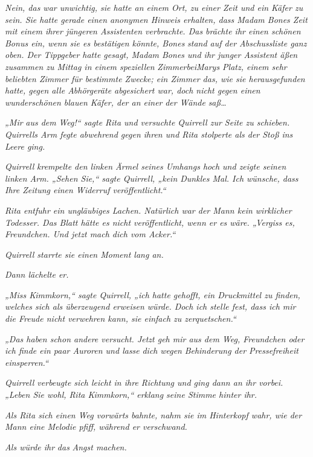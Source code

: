 {\emph{Nein, das war unwichtig, sie hatte an einem Ort, zu einer Zeit und ein Käfer zu sein. Sie hatte gerade einen anonymen Hinweis erhalten, dass Madam Bones Zeit mit einem ihrer jüngeren Assistenten verbrachte. Das brächte ihr einen schönen Bonus ein, wenn sie es bestätigen könnte, Bones} \emph{stand auf der Abschussliste ganz oben. Der Tippgeber hatte gesagt, Madam Bones und ihr junger Assistent äßen zusammen zu Mittag in einem speziellen} \emph{ZimmerbeiMarys Platz, einem sehr beliebten Zimmer für bestimmte Zwecke; ein Zimmer das, wie sie herausgefunden hatte, gegen alle Abhörgeräte abgesichert war, doch nicht gegen einen wunderschönen blauen Käfer, der an einer} \emph{der Wände} \emph{saß…}

\emph{„Mir} \emph{aus dem} \emph{\emph{Weg!}“ sagte Rita und versuchte Quirrell zur Seite zu schieben. Quirrells Arm fegte abwehrend gegen ihren und Rita stolperte als der Stoß ins Leere ging.}

\emph{Quirrell} \emph{krempelte den linken Ärmel seines Umhangs hoch und zeigte seinen linken Arm. „Sehen Sie,“ sagte Quirrell, „kein Dunkles Mal. Ich wünsche, dass} \emph{Ihre Zeitung einen Widerruf veröffentlicht.“}

\emph{Rita entfuhr ein ungläubiges Lachen. Natürlich war der Mann kein wirklicher Todesser. Das Blatt hätte es nicht veröffentlicht, wenn er es wäre. „Vergiss es, Freundchen. Und jetzt mach dich vom Acker.“}

\emph{Quirrell starrte sie einen Moment lang an.}

\emph{Dann lächelte er.}

\emph{„Miss Kimmkorn,“ sagte Quirrell, „ich hatte gehofft, ein Druckmittel zu finden, welches sich als überzeugend erweisen würde. Doch ich stelle fest, dass ich mir die Freude nicht verwehren kann, sie einfach zu zerquetschen.“}

\emph{„Das haben schon andere versucht. Jetzt geh mir aus dem Weg, Freundchen oder ich finde ein paar Auroren und lasse} \emph{dich} \emph{wegen} \emph{Behinderung der Pressefreiheit einsperren.“}

\emph{Quirrell verbeugte sich leicht in ihre Richtung und ging dann an ihr vorbei. „Leben Sie wohl, Rita Kimmkorn,“ erklang seine Stimme hinter ihr.}

\emph{Als Rita sich einen Weg vorwärts bahnte, nahm sie im Hinterkopf wahr, wie der Mann eine Melodie pfiff, während er verschwand.}

\emph{Als würde ihr} \emph{\emph{das}} \emph{Angst machen.}

}
